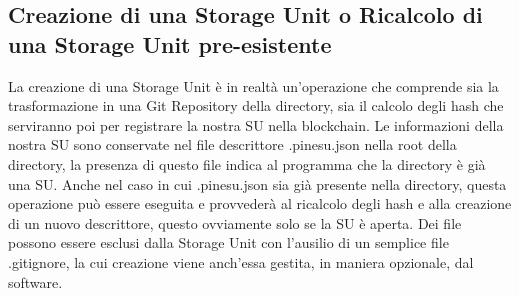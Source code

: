 \subsection{Creazione di una Storage Unit o Ricalcolo di una Storage Unit pre-esistente}
La creazione di una Storage Unit è in realtà un'operazione che comprende sia la trasformazione in una Git Repository della directory, sia il calcolo degli hash che serviranno poi per registrare la nostra SU nella blockchain. Le informazioni della nostra SU sono conservate nel file descrittore \textsf{.pinesu.json} nella root della directory, la presenza di questo file indica al programma che la directory è già una SU. Anche nel caso in cui .pinesu.json sia già presente nella directory, questa operazione può essere eseguita e provvederà al ricalcolo degli hash e alla creazione di un nuovo descrittore, questo ovviamente solo se la SU è aperta.
Dei file possono essere esclusi dalla Storage Unit con l'ausilio di un semplice file \textsf{.gitignore}, la cui creazione viene anch'essa gestita, in maniera opzionale, dal software.

